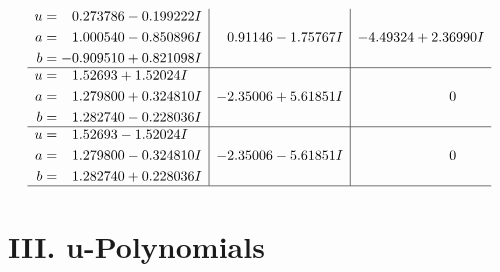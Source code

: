 \documentclass[1p]{elsarticle_modified}
\theoremstyle{definition}
\begin{document}
$$\begin{array}{c|c|c}
\begin{aligned}
u &= \phantom{-}0.273786 - 0.199222 I \\
a &= \phantom{-}1.000540 - 0.850896 I \\
b &= -0.909510 + 0.821098 I\end{aligned}
 & \phantom{-}0.91146 - 1.75767 I & -4.49324 + 2.36990 I \\ \hline\begin{aligned}
u &= \phantom{-}1.52693 + 1.52024 I \\
a &= \phantom{-}1.279800 + 0.324810 I \\
b &= \phantom{-}1.282740 - 0.228036 I\end{aligned}
 & -2.35006 + 5.61851 I & \phantom{-0.000000 } 0 \\ \hline\begin{aligned}
u &= \phantom{-}1.52693 - 1.52024 I \\
a &= \phantom{-}1.279800 - 0.324810 I \\
b &= \phantom{-}1.282740 + 0.228036 I\end{aligned}
 & -2.35006 - 5.61851 I & \phantom{-0.000000 } 0\\
 \hline 
 \end{array}$$\newpage
\newpage\renewcommand{\arraystretch}{1}
\centering \section*{ III. u-Polynomials}
\end{document}
